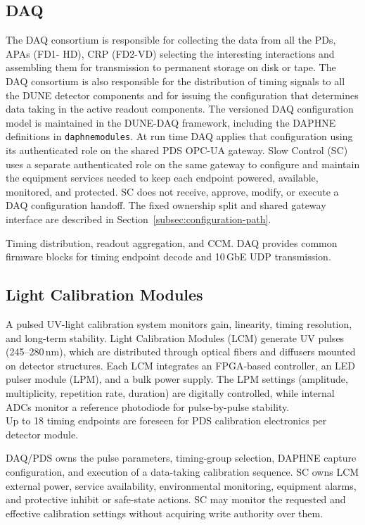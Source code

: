 \subsection{DAQ}
The DAQ consortium is responsible for collecting the data from all the PDs, APAs (FD1-
HD), CRP (FD2-VD) selecting the interesting interactions and assembling them for
transmission to permanent storage on disk or tape. The DAQ consortium is also responsible
for the distribution of timing signals to all the DUNE detector components and for issuing
the configuration that determines data taking in the active readout components. The
versioned DAQ configuration model is maintained in the DUNE-DAQ framework, including the
DAPHNE definitions in \texttt{daphnemodules}. At run time DAQ applies that configuration
using its authenticated role on the shared PDS OPC-UA gateway. Slow Control (SC) uses a
separate authenticated role on the same gateway to configure and maintain the equipment
services needed to keep each endpoint powered, available, monitored, and protected. SC
does not receive, approve, modify, or execute a DAQ configuration handoff. The fixed
ownership split and shared gateway interface are described in
Section~\ref{subsec:configuration-path}.

Timing distribution, readout aggregation, and CCM. DAQ provides common firmware blocks for timing endpoint decode and 10\,GbE UDP transmission.

\subsection{Light Calibration Modules}
A pulsed UV-light calibration system monitors gain, linearity, timing resolution, and long-term stability. Light Calibration Modules (LCM) generate UV pulses (245--280\,nm), which are distributed through optical fibers and diffusers mounted on detector structures. Each LCM integrates an FPGA-based controller, an LED pulser module (LPM), and a bulk power supply. The LPM settings (amplitude, multiplicity, repetition rate, duration) are digitally controlled, while internal ADCs monitor a reference photodiode for pulse-by-pulse stability.\\
Up to 18 timing endpoints are foreseen for PDS calibration electronics per detector module.

DAQ/PDS owns the pulse parameters, timing-group selection, DAPHNE capture configuration,
and execution of a data-taking calibration sequence. SC owns LCM external power, service
availability, environmental monitoring, equipment alarms, and protective inhibit or
safe-state actions. SC may monitor the requested and effective calibration settings without
acquiring write authority over them.

